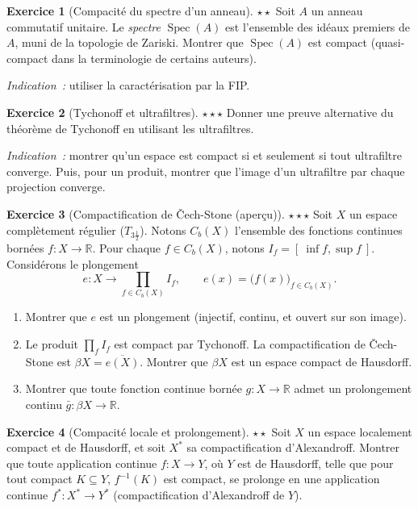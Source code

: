 \documentclass[12pt,a4paper,openany]{book}
\theoremstyle{definition}
\theoremstyle{cours}
\theoremstyle{coursnormal}
\newtheorem{exercice}{Exercice}[chapter]
\newcommand{\R}{\mathbb{R}}
\begin{document}
\begin{exercice}[Compacité du spectre d'un anneau]\label{exo:exo:spectre}%
  {\normalfont\textbf{$\star\star$}}
  Soit $A$ un anneau commutatif unitaire. Le \emph{spectre} $\operatorname{Spec}(A)$
  est l'ensemble des idéaux premiers de $A$, muni de la topologie de Zariski.
  Montrer que $\operatorname{Spec}(A)$ est compact (quasi-compact dans la
  terminologie de certains auteurs).

  \emph{Indication~:} utiliser la caractérisation par la FIP.
\end{exercice}

\begin{exercice}[Tychonoff et ultrafiltres]\label{exo:exo:tychonoff-ultrafiltres}%
  {\normalfont\textbf{$\star\star\star$}}
  Donner une preuve alternative du théorème de Tychonoff en utilisant les
  ultrafiltres.

  \emph{Indication~:} montrer qu'un espace est compact si et seulement si tout
  ultrafiltre converge. Puis, pour un produit, montrer que l'image d'un
  ultrafiltre par chaque projection converge.
\end{exercice}

\begin{exercice}[Compactification de Čech-Stone (aperçu)]\label{exo:exo:cech-stone}%
  {\normalfont\textbf{$\star\star\star$}}
  Soit $X$ un espace complètement régulier ($T_{3\frac{1}{2}}$). Notons
  $C_b(X)$ l'ensemble des fonctions continues bornées $f\colon X\to\R$. Pour
  chaque $f\in C_b(X)$, notons $I_f=[\ \inf f,\sup f\ ]$. Considérons le
  plongement
  \[
    e\colon X\to\prod_{f\in C_b(X)}I_f,\qquad e(x)=\bigl(f(x)\bigr)_{f\in C_b(X)}.
  \]
  \begin{enumerate}
    \item Montrer que $e$ est un plongement (injectif, continu, et ouvert sur
      son image).
    \item Le produit $\prod_{f}I_f$ est compact par Tychonoff. La
      compactification de \v{C}ech-Stone est $\beta X=\overline{e(X)}$.
      Montrer que $\beta X$ est un espace compact de Hausdorff.
    \item Montrer que toute fonction continue bornée $g\colon X\to\R$ admet un
      prolongement continu $\bar{g}\colon\beta X\to\R$.
  \end{enumerate}
\end{exercice}

\begin{exercice}[Compacité locale et prolongement]\label{exo:exo:locale-prolongement}%
  {\normalfont\textbf{$\star\star$}}
  Soit $X$ un espace localement compact et de Hausdorff, et soit $X^*$ sa
  compactification d'Alexandroff. Montrer que toute application continue
  $f\colon X\to Y$, où $Y$ est de Hausdorff, telle que pour tout compact
  $K\subseteq Y$, $f^{-1}(K)$ est compact, se prolonge en une application
  continue $f^*\colon X^*\to Y^*$ (compactification d'Alexandroff de $Y$).
\end{exercice}
\end{document}
